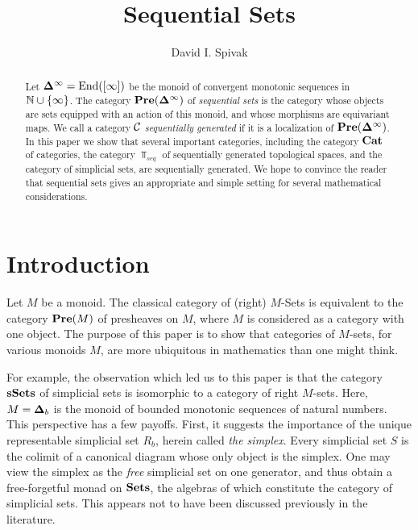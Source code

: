 \documentclass{amsart}
\def\Del{{\bf \Delta}}
\def\Delinf{{\Del^\infty}}
\def\Delb{{\Del_b}}
\begin{document}
\title{Sequential Sets}

\author{David I. Spivak}

\maketitle

\begin{abstract}

Let $\Delinf=\End([\infty])$ be the monoid of convergent monotonic sequences in ${\mathbb N}\cup\{\infty\}$.  The category $\Pre(\Delinf)$ of {\em sequential sets} is the category whose objects are sets equipped with an action of this monoid, and whose morphisms are equivariant maps.  We call a category $\mathcal{C}$ {\em sequentially generated} if it is a localization of $\Pre(\Delinf)$.  In this paper we show that several important categories, including the category ${\bf Cat}$ of categories, the category $\Top_{seq}$ of sequentially generated topological spaces, and the category of simplicial sets, are sequentially generated.  We hope to convince the reader that sequential sets gives an appropriate and simple setting for several mathematical considerations.

\end{abstract}

\setcounter{tocdepth}{1}
\tableofcontents



\section{Introduction}

Let $M$ be a monoid.  The classical category of (right) $M$-Sets is equivalent to the category ${\bf Pre}(M)$ of presheaves on $M$, where $M$ is considered as a category with one object.  The purpose of this paper is to show that categories of $M$-sets, for various monoids $M$, are more ubiquitous in mathematics than one might think.  

For example, the observation which led us to this paper is that the category ${\bf sSets}$ of simplicial sets is isomorphic to a category of right $M$-sets.  Here, $M=\Delb$ is the monoid of bounded monotonic sequences of natural numbers.  This perspective has a few payoffs.  First, it suggests the importance of the unique representable simplicial set $R_b$, herein called {\em the simplex}.  Every simplicial set $S$ is the colimit of a canonical diagram whose only object is the simplex.  One may view the simplex as the {\em free} simplicial set on one generator, and thus obtain a free-forgetful monad on ${\bf Sets}$, the algebras of which constitute the category of simplicial sets.  This appears not to have been discussed previously in the literature.
\end{document}

